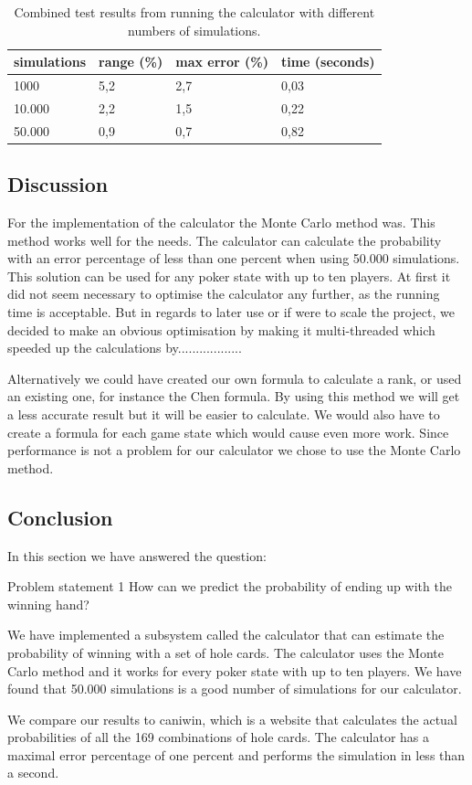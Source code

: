 \vspace{4mm}
\begin{table}[H]
  \center
  \begin{tabular}{ | l | l | l | l | }
    \hline
    simulations & range (\%) & max error (\%) & time (seconds) \\
    \hline                       
    1000 & 5,2 & 2,7 & 0,03 \\
    10.000 & 2,2 & 1,5 & 0,22\\
    50.000 & 0,9 & 0,7 & 0,82\\
  \hline  
  \end{tabular}
  \caption{Combined test results from running the calculator with different numbers of simulations. \label{tab:mc-total}}
\end{table}
\vspace{4mm}

\subsection{Discussion}
For the implementation of the calculator the Monte Carlo method was. This method works well for the needs. The calculator can calculate the probability with an error percentage of less than one percent when using 50.000 simulations. This solution can be used for any poker state with up to ten players. At first it did not seem necessary to optimise the calculator any further, as the running time is acceptable. But in regards to later use or if were to scale the project, we decided to make an obvious optimisation by making it multi-threaded which speeded up the calculations by..................

Alternatively we could have created our own formula to calculate a rank, or used an existing one, for instance the Chen formula. By using this method we will get a less accurate result but it will be easier to calculate. We would also have to create a formula for each game state which would cause even more work. Since performance is not a problem for our calculator we chose to use the Monte Carlo method.

\subsection{Conclusion}
In this section we have answered the question:
\vspace{4mm}
\begin{statementBox2}{Problem statement 1}
How can we predict the probability of ending up with the winning hand?
\end{statementBox2}
\vspace{4mm}

We have implemented a subsystem called the calculator that can estimate the probability of winning with a set of hole cards. The calculator uses the Monte Carlo method and it works for every poker state with up to ten players. We have found that 50.000 simulations is a good number of simulations for our calculator. 

We compare our results to caniwin, which is a website that calculates the actual probabilities of all the 169 combinations of hole cards. The calculator has a maximal error percentage of one percent and performs the simulation in less than a second.